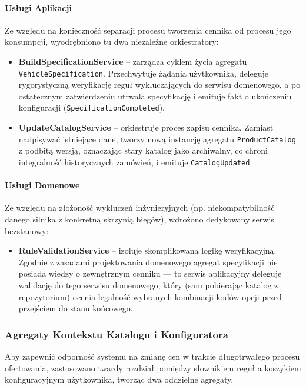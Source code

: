 \paragraph{Usługi Aplikacji}
Ze względu na konieczność separacji procesu tworzenia cennika od procesu jego konsumpcji, wyodrębniono tu dwa niezależne orkiestratory:
\begin{itemize}
    \item \textbf{BuildSpecificationService} – zarządza cyklem życia agregatu \texttt{VehicleSpecification}. Przechwytuje żądania użytkownika, deleguje rygorystyczną weryfikację reguł wykluczających do serwisu domenowego, a po ostatecznym zatwierdzeniu utrwala specyfikację i emituje fakt o ukończeniu konfiguracji (\texttt{SpecificationCompleted}).
    \item \textbf{UpdateCatalogService} – orkiestruje proces zapisu cennika. Zamiast nadpisywać istniejące dane, tworzy nową instancję agregatu \texttt{ProductCatalog} z podbitą wersją, oznaczając stary katalog jako archiwalny, co chroni integralność historycznych zamówień, i emituje \texttt{CatalogUpdated}.
\end{itemize}

\paragraph{Usługi Domenowe}
Ze względu na złożoność wykluczeń inżynieryjnych (np. niekompatybilność danego silnika z konkretną skrzynią biegów), wdrożono dedykowany serwis bezstanowy:
\begin{itemize}
    \item \textbf{RuleValidationService} – izoluje skomplikowaną logikę weryfikacyjną. Zgodnie z zasadami projektowania domenowego agregat specyfikacji nie posiada wiedzy o zewnętrznym cenniku — to serwis aplikacyjny deleguje walidację do tego serwisu domenowego, który (sam pobierając katalog z repozytorium) ocenia legalność wybranych kombinacji kodów opcji przed przejściem do stanu końcowego.
\end{itemize}

\subsubsection{Agregaty Kontekstu Katalogu i Konfiguratora}

Aby zapewnić odporność systemu na zmianę cen w trakcie długotrwałego procesu ofertowania, zastosowano twardy rozdział pomiędzy słownikiem reguł a koszykiem konfiguracyjnym użytkownika, tworząc dwa oddzielne agregaty.

